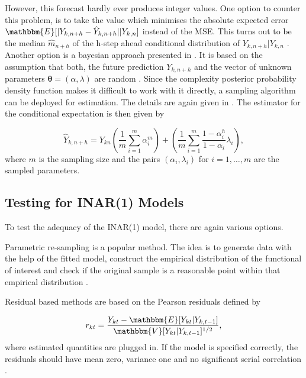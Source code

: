 However, this forecast hardly ever produces integer values. One option to counter this problem, is to take the value which minimises the absolute expected error $\mathbbm{E}[\abs{Y_{k,n+h} - \hat{Y}_{k,n+h}}|Y_{k,n}]$ instead of the MSE. This turns out to be the median $\hat{m}_{n+h}$ of the h-step ahead conditional distribution of $Y_{k,n+h}|Y_{k,n}$ \textcite{Silva:2005,Freeland:2004}. Another option is a bayesian approach presented in \textcite{Silva:2005}. It is based on the assumption that both, the future prediction $Y_{k,n+h}$ and the vector of unknown parameters $\bm{\theta}=(\alpha,\lambda)$ are random \textcite{Silva:2005}. Since the complexity posterior probability density function makes it difficult to work with it directly, a sampling algorithm can be deployed for estimation. The details are again given in \textcite{Silva:2005}. The estimator for the conditional expectation is then given by

\begin{equation}
\hat{Y}_{k,n+h}= Y_{kn}\left(\frac{1}{m} \sum_{i=1}^m\alpha_i^m\right) + \left(\frac{1}{m} \sum_{i=1}^m \frac{1-\alpha_i^h}{1-\alpha_i}\lambda_i\right),
\label{eq:Forecasting Bayesian}
\end{equation}
%
where $m$ is the sampling size and the pairs $(\alpha_i,\lambda_i)$ for $i=1,\ldots,m$ are the sampled parameters. 

\subsection{Testing for INAR(1) Models}
\label{sec:Testing for INAR(1) Models}

To test the adequacy of the INAR(1) model, there are again various options. 

Parametric re-sampling is a popular method. The idea is to generate data with the help of the fitted model, construct the empirical distribution of the functional of interest and check if the original sample is a reasonable point within that empirical distribution \textcite{Silva:2005}. 

Residual based methods are based on the Pearson residuals defined by 

\begin{equation}
r_{kt} = \frac{Y_{kt}-\mathbbm{E}[Y_{kt}|Y_{k,t-1}]}{\mathbbm{V}[Y_{kt}|Y_{k,t-1}]^{1/2}},
\label{eq:Pearson residuals}
\end{equation}
%
where estimated quantities are plugged in. If the model is specified correctly, the residuals should have mean zero, variance one and no significant serial correlation \textcite{Silva:2005}. 

